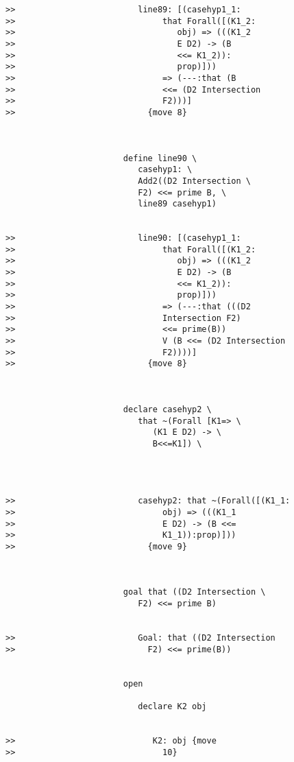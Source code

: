 \documentclass[12pt]{article}
\begin{document}
\begin{verbatim}
>>                         line89: [(casehyp1_1:
>>                              that Forall([(K1_2:
>>                                 obj) => (((K1_2
>>                                 E D2) -> (B
>>                                 <<= K1_2)):
>>                                 prop)]))
>>                              => (---:that (B
>>                              <<= (D2 Intersection
>>                              F2)))]
>>                           {move 8}



                        define line90 \
                           casehyp1: \
                           Add2((D2 Intersection \
                           F2) <<= prime B, \
                           line89 casehyp1)


>>                         line90: [(casehyp1_1:
>>                              that Forall([(K1_2:
>>                                 obj) => (((K1_2
>>                                 E D2) -> (B
>>                                 <<= K1_2)):
>>                                 prop)]))
>>                              => (---:that (((D2
>>                              Intersection F2)
>>                              <<= prime(B))
>>                              V (B <<= (D2 Intersection
>>                              F2))))]
>>                           {move 8}



                        declare casehyp2 \
                           that ~(Forall [K1=> \
                              (K1 E D2) -> \
                              B<<=K1]) \
                           



>>                         casehyp2: that ~(Forall([(K1_1:
>>                              obj) => (((K1_1
>>                              E D2) -> (B <<=
>>                              K1_1)):prop)]))
>>                           {move 9}



                        goal that ((D2 Intersection \
                           F2) <<= prime B)


>>                         Goal: that ((D2 Intersection
>>                           F2) <<= prime(B))


                        open

                           declare K2 obj


>>                            K2: obj {move
>>                              10}




\end{verbatim}
\end{document}

